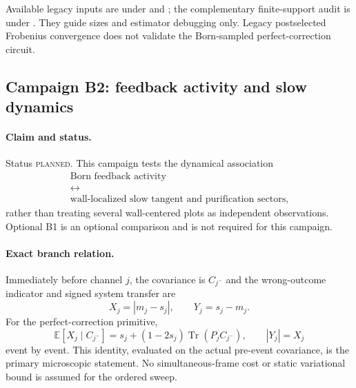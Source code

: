 \documentclass[aps,prx,twocolumn,floatfix,nofootinbib,superscriptaddress,longbibliography]{revtex4-2}
\newcommand{\E}{\mathbb{E}}
\newcommand{\qTr}{\operatorname{Tr}}
\newcommand{\planned}{\textsc{planned}}
\begin{document}
Available legacy inputs are under
 and
; the complementary finite-support audit
is under .
They guide sizes and estimator debugging only.  Legacy postselected Frobenius convergence
does not validate the Born-sampled perfect-correction circuit.

\subsection{Campaign B2: feedback activity and slow dynamics}
\label{camp:B2}
\paragraph*{Claim and status.}
Status \planned.  This campaign tests the dynamical association
\begin{equation}
 \begin{gathered}
 \text{Born feedback activity}\\[-2pt]
 \longleftrightarrow\\[-2pt]
 \text{wall-localized slow tangent and purification sectors},
 \end{gathered}
 \label{eq:mechanism-chain}
\end{equation}
rather than treating several wall-centered plots as independent observations.  Optional B1
is an optional comparison and is not required for this campaign.

\paragraph*{Exact branch relation.}
Immediately before channel $j$, the covariance is $C_{j^-}$ and the wrong-outcome
indicator and signed system transfer are
\begin{equation}
 X_j=|m_j-s_j|,
 \qquad Y_j=s_j-m_j.
\end{equation}
For the perfect-correction primitive,
\begin{equation}
 \E[X_j\mid C_{j^-}]
 =s_j+(1-2s_j)\qTr(P_jC_{j^-}),
 \qquad |Y_j|=X_j
 \label{eq:activity-identity}
\end{equation}
event by event.  This identity, evaluated on the actual pre-event covariance, is the
primary microscopic statement.  No simultaneous-frame cost or static variational bound is
assumed for the ordered sweep.
\end{document}
